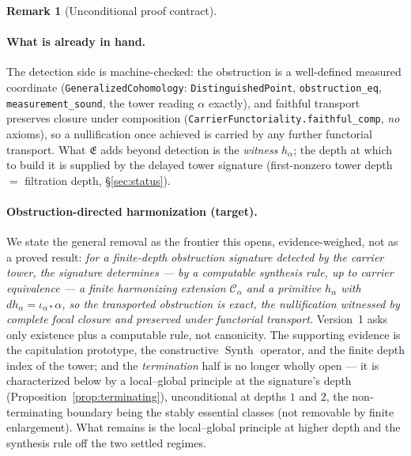 \documentclass[11pt]{article}
\theoremstyle{definition}
\newtheorem{remark}[theorem]{Remark}
\begin{document}
\begin{remark}[Unconditional proof contract]
\begin{enumerate}
\paragraph{What is already in hand.} The detection side is machine-checked: the obstruction is a well-defined
measured coordinate (\texttt{GeneralizedCohomology}: \texttt{DistinguishedPoint}, \texttt{obstruction\_eq},
\texttt{measurement\_sound}, the tower reading $\alpha$ exactly), and faithful transport preserves closure under
composition (\texttt{CarrierFunctoriality.faithful\_comp}, \emph{no} axioms), so a nullification once achieved is
carried by any further functorial transport. What $\mathfrak E$ adds beyond detection is the \emph{witness}
$h_\alpha$; the depth at which to build it is supplied by the delayed tower signature (first-nonzero tower depth
$=$ filtration depth, \S\ref{sec:status}).

\paragraph{Obstruction-directed harmonization (target).} We state the general removal as the frontier this opens,
evidence-weighed, not as a proved result: \emph{for a finite-depth obstruction signature detected by the carrier
tower, the signature determines --- by a computable synthesis rule, up to carrier equivalence --- a finite
harmonizing extension $\mathcal C_\alpha$ and a primitive $h_\alpha$ with $d h_\alpha=\iota_{\alpha*}\alpha$, so
the transported obstruction is exact, the nullification witnessed by complete focal closure and preserved under
functorial transport.} Version~1 asks only existence plus a computable rule, not canonicity. The supporting
evidence is the capitulation prototype, the constructive $\operatorname{Synth}$ operator, and the finite depth
index of the tower; and the \emph{termination} half is no longer wholly open --- it is characterized below by a
local--global principle at the signature's depth (Proposition~\ref{prop:terminating}), unconditional at depths
$1$ and $2$, the non-terminating boundary being the stably essential classes (not removable by finite
enlargement). What remains is the local--global principle at higher depth and the synthesis rule off the two
settled regimes.


\end{enumerate}
\end{remark}
\end{document}
